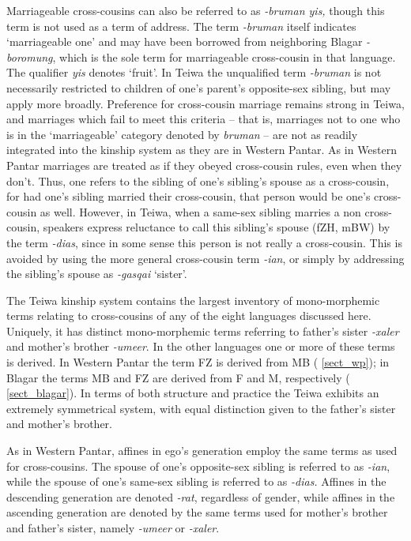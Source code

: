 Marriageable cross-cousins can also be referred to as \textit{-bruman yis,} though this term is not used as a term of address. The term \textit{-bruman} itself indicates `marriageable one' and may have been borrowed from neighboring Blagar \textit{-boromung}, which is the sole term for marriageable cross-cousin in that language. The qualifier \textit{yis} denotes `fruit'. In Teiwa the unqualified term \textit{-bruman} is not necessarily restricted to children of one's parent's opposite-sex sibling, but may apply more broadly. Preference for cross-cousin marriage remains strong in Teiwa, and marriages which fail to meet this criteria -- that is, marriages not to one who is in the `marriageable' category denoted by \textit{bruman}{} -- are not as readily integrated into the kinship system as they are in Western Pantar. As in Western Pantar marriages are treated as if they obeyed cross-cousin rules, even when they don't. Thus, one refers to the sibling of one's sibling's spouse as a cross-cousin, for had one's sibling married their cross-cousin, that person would be one's cross-cousin as well. However, in Teiwa, when a same-sex sibling marries a non cross-cousin, speakers express reluctance to call this sibling's spouse (fZH, mBW) by the term \textit{-dias}, since in some sense this person is not really a cross-cousin. This is avoided by using the more general cross-cousin term \textit{-ian}, or simply by addressing the sibling's spouse as \textit{-gasqai} `sister'. 

The Teiwa kinship system contains the largest inventory of mono-morphemic terms relating to cross-cousins of any of the eight languages discussed here. Uniquely, it has distinct mono-morphemic terms referring to father's sister \textit{-xaler} and mother's brother \textit{-umeer}. In the other languages one or more of these terms is derived. In Western Pantar the term FZ is derived from MB ({\SS} \ref{sect_wp}); in Blagar the terms MB and FZ are derived from F and M, respectively ({\SS} \ref{sect_blagar}). In terms of both structure and practice the Teiwa exhibits an extremely symmetrical system, with equal distinction given to the father's sister and mother's brother. 

As in Western Pantar, affines in ego's generation employ the same terms as used for cross-cousins. The spouse of one's opposite-sex sibling is referred to as \textit{-ian}, while the spouse of one's same-sex sibling is referred to as \textit{-dias.} Affines in the descending generation are denoted \textit{-rat}, regardless of gender, while affines in the ascending generation are denoted by the same terms used for mother's brother and father's sister, namely \textit{-umeer} or \textit{-xaler}. 


